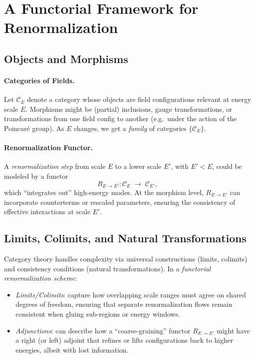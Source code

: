 \documentclass[12pt]{article}
\begin{document}
\section{A Functorial Framework for Renormalization}
\label{sec:functorial_renorm}

\subsection{Objects and Morphisms}

\paragraph{Categories of Fields.}
Let \(\mathcal{C}_E\) denote a category whose objects are field configurations relevant at energy scale \(E\). 
Morphisms might be (partial) inclusions, gauge transformations, or transformations from one field config to another 
(e.g.\ under the action of the Poincar\'e group). As \(E\) changes, we get a \emph{family} of categories \(\{\mathcal{C}_E\}\).

\paragraph{Renormalization Functor.}
A \emph{renormalization step} from scale \(E\) to a lower scale \(E'\), with \(E' < E\), could be modeled by a functor
\[
R_{E \to E'} : \mathcal{C}_E \;\longrightarrow\; \mathcal{C}_{E'},
\]
which “integrates out” high-energy modes. At the morphism level, $R_{E \to E'}$ can incorporate 
counterterms or rescaled parameters, ensuring the consistency of effective interactions at scale $E'$.

\subsection{Limits, Colimits, and Natural Transformations}
Category theory handles complexity via universal constructions (limits, colimits) and consistency conditions (natural transformations). 
In a \emph{functorial renormalization scheme}:
\begin{itemize}
    \item \emph{Limits/Colimits}: capture how overlapping scale ranges must agree on shared degrees of freedom, 
    ensuring that separate renormalization flows remain consistent when gluing sub-regions or energy windows.
    \item \emph{Adjunctions}: can describe how a “coarse-graining” functor $R_{E \to E'}$ might have a right (or left) adjoint 
    that refines or lifts configurations back to higher energies, albeit with lost information.
\end{itemize}
\end{document}
